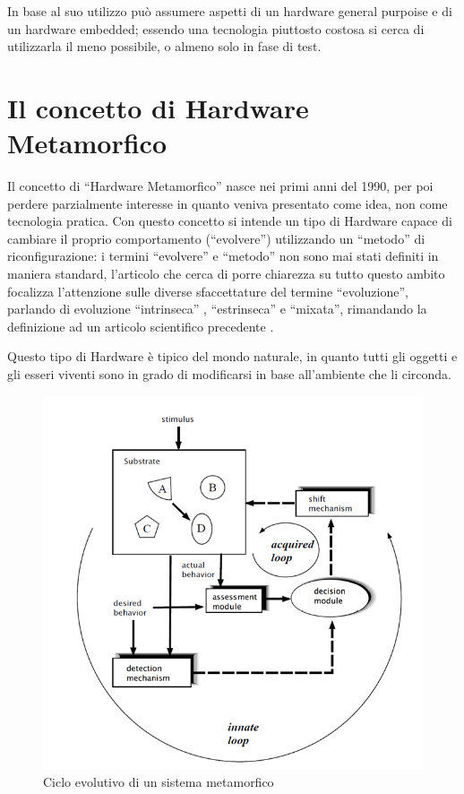 \documentclass[11pt]{article} %
\begin{document}
In base al suo utilizzo può assumere aspetti di un hardware general purpoise e di un hardware embedded; essendo una tecnologia piuttosto costosa si cerca di utilizzarla il meno possibile, o almeno solo in fase di test.

\section{Il concetto di Hardware Metamorfico}

Il concetto di ``Hardware Metamorfico'' nasce nei primi anni del 1990, per poi perdere parzialmente interesse in quanto veniva presentato come idea, non come tecnologia pratica. Con questo concetto si intende un tipo di Hardware capace di cambiare il proprio comportamento (``evolvere'') utilizzando un ``metodo'' di riconfigurazione: i termini ``evolvere'' e ``metodo'' non sono mai stati definiti in maniera standard, l'articolo che cerca di porre chiarezza su tutto questo ambito \cite{MS1} focalizza l'attenzione sulle diverse sfaccettature del termine ``evoluzione'', parlando di evoluzione ``intrinseca'' , ``estrinseca'' e ``mixata'', rimandando la definizione ad un articolo scientifico precedente \cite{EIE}.

Questo tipo di Hardware è tipico del mondo naturale, in quanto tutti gli oggetti e gli esseri viventi sono in grado di modificarsi in base all'ambiente che li circonda.

\begin{figure}
\centering
\includegraphics[scale=0.6]{ciclo_evolutivo.png}
\caption{Ciclo evolutivo di un sistema metamorfico}\label{fig:1}
\end{figure}
\end{document}
